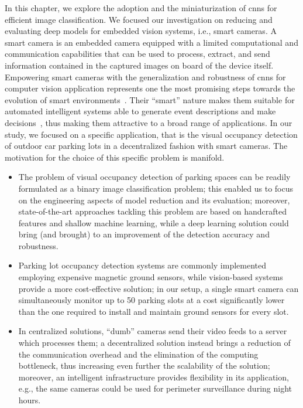 In this chapter, we explore the adoption and the miniaturization of \glspl{cnn} for efficient image classification.
We focused our investigation on reducing and evaluating deep models for embedded vision systems, i.e., smart cameras.
A smart camera is an embedded camera equipped with a limited computational and communication capabilities that can be used to process, extract, and send information contained in the captured images on board of the device itself.
Empowering smart cameras with the generalization and robustness of \glspl{cnn} for computer vision application represents one the most promising steps towards the evolution of smart environments~\cite{valera2005intelligent}.
Their ``smart'' nature makes them suitable for automated intelligent systems able to generate event descriptions and make decisions~\cite{belbachir2010smart}, thus making them attractive to a broad range of applications.
In our study, we focused on a specific application, that is the visual occupancy detection of outdoor car parking lots in a decentralized fashion with smart cameras.
The motivation for the choice of this specific problem is manifold.
\begin{itemize}
    \item The problem of visual occupancy detection of parking spaces can be readily formulated as a binary image classification problem;
    this enabled us to focus on the engineering aspects of model reduction and its evaluation;
    moreover, state-of-the-art approaches tackling this problem are based on handcrafted features and shallow machine learning, while a deep learning solution could bring (and brought) to an improvement of the detection accuracy and robustness.

    \item Parking lot occupancy detection systems are commonly implemented employing expensive magnetic ground sensors, while vision-based systems provide a more cost-effective solution;
    in our setup, a single smart camera can simultaneously monitor up to 50 parking slots at a cost significantly lower than the one required to install and maintain ground sensors for every slot.

    \item In centralized solutions, ``dumb'' cameras send their video feeds to a server which processes them;
    a decentralized solution instead brings a reduction of the communication overhead and the elimination of the computing bottleneck, thus increasing even further the scalability of the solution;
    moreover, an intelligent infrastructure provides flexibility in its application, e.g., the same cameras could be used for perimeter surveillance during night hours.

\end{itemize}
